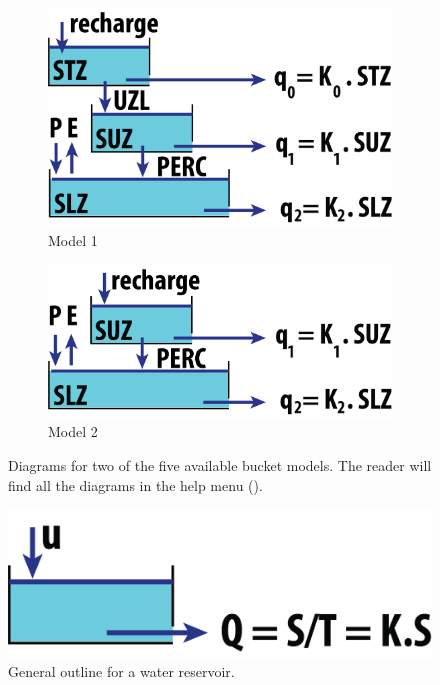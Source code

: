 \begin{figure}[htbp]
     \centering
     \begin{subfigure}[b]{0.45\textwidth}
         \centering
         \includegraphics[width=\textwidth]{bucket_3_outlet_3}
         \caption{Model 1}
         \label{fig:b3_o3}
     \end{subfigure}
     \hfill
     \begin{subfigure}[b]{0.45\textwidth}
         \centering
         \includegraphics[width=\textwidth]{bucket_2_outlet_2}
         \caption{Model 2}
         \label{fig:b2_o2}         
     \end{subfigure}
     \caption{Diagrams for two of the five available bucket models. The reader will find all the diagrams in
     the help menu ().}
        \label{fig:bucket_models}         
\end{figure}


\begin{figure}[htbp]
  \centering
  \includegraphics[scale = 0.6]{bucket_discrete_scheme}
  \caption{General outline for a water reservoir.}
  \label{fig:discrete}
\end{figure}

